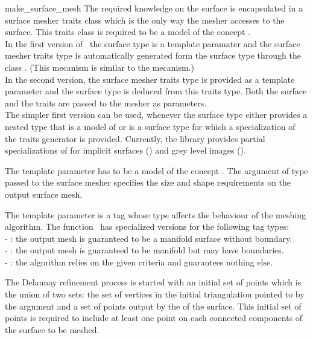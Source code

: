 \begin{ccRefFunction}{make_surface_mesh}
The required knowledge on the surface is encapsulated in
a surface mesher traits class  which is the only way the mesher
 accesses to the surface. This traits class is required to be a model
of the concept . \\
In the first  version
of  \ccRefName\, the surface type is a template paramater 
and the surface mesher traits type 
is  automatically generated form the surface type  through
the class 
.
(This mecanism is similar to the 
  mecanism.) \\
In the second version, the surface mesher traits type is provided
as a template parameter 
and the surface type is deduced from this traits type.
Both the surface and the traits 
are passed to the mesher as parameters. \\
The simpler first version can be used,
whenever the surface type either provides  a nested type
that is  a model of 
or is a surface type for which a specialization
of the traits generator 
is provided.
Currently, the library provides partial specializations
of  
for implicit surfaces () and 
grey level images ().
 


The template parameter  has to be a model
of the concept .
The argument of type   passed to the surface
mesher specifies the size and shape  requirements
on the output surface mesh.

The template parameter 
is a tag whose type affects the behaviour of the
meshing algorithm. The function \ccRefName\  has specialized versions
for the following  tag types: \\
- : the output mesh is guaranteed to be a manifold
surface without boundary.\\
- : the output mesh is guaranteed to be
manifold but may have boundaries.\\
- : the algorithm relies on the given criteria and
guarantees nothing else.



The Delaunay refinement
process is started with an initial set of points which is the union 
of two sets: the
set of vertices in the initial  triangulation pointed to by the
 argument   and a set of
points output by the  
of the surface.
This initial set of points is required to include at least one point
on each connected components of the surface to be meshed.




\end{ccRefFunction}
